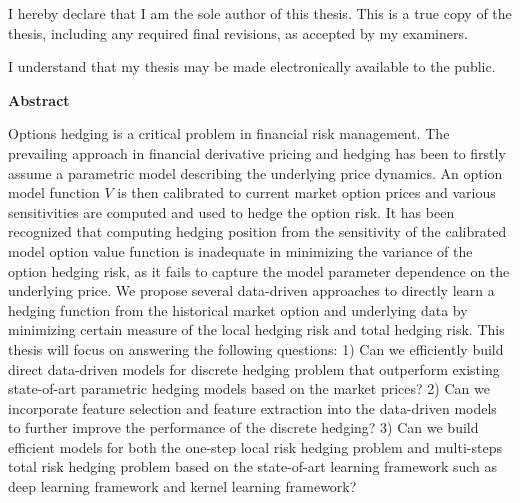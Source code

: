 
\cleardoublepage

  \noindent
I hereby declare that I am the sole author of this thesis. This is a true copy of the thesis, including any required final revisions, as accepted by my examiners.

  \bigskip

  \noindent
I understand that my thesis may be made electronically available to the public.

\cleardoublepage


\begin{center}\textbf{Abstract}\end{center}
Options hedging is a critical problem in financial risk management. The prevailing approach in financial derivative pricing and hedging has been to firstly assume a parametric model describing the underlying price dynamics.  An option model function $V$ is then calibrated to current  market option prices and various sensitivities are computed and  used to hedge the option risk.  It has been recognized that computing hedging position from the sensitivity of the calibrated model option value function is inadequate in minimizing  the variance of the option hedging risk, as it fails to capture the model parameter dependence on the underlying price.
We propose several data-driven approaches to directly learn a hedging function from the historical market option and underlying data by minimizing certain measure of the local hedging risk and total hedging risk. This thesis will focus on answering the following questions: 1) Can we efficiently build direct data-driven models for discrete hedging problem that outperform existing state-of-art parametric hedging models based on the market prices? 2) Can we incorporate feature selection and feature extraction into the data-driven models to further improve the performance of the discrete hedging? 3) Can we build efficient models for both the one-step local risk hedging problem and multi-steps total risk hedging problem based on the state-of-art learning framework such as deep learning framework and kernel learning framework?

